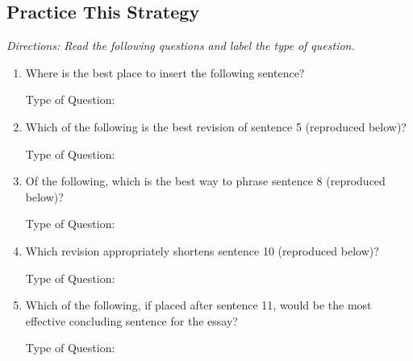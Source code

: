 \subsection{Practice This Strategy}
\textit{Directions: Read the following questions and label the type of question.}

\begin{enumerate}
\item Where is the best place to insert the following sentence?

Type of Question: \hrulefill

\item Which of the following is the best revision of sentence 5 (reproduced below)?

Type of Question: \hrulefill

\item Of the following, which is the best way to phrase sentence 8 (reproduced below)?

Type of Question: \hrulefill

\item Which revision appropriately shortens sentence 10 (reproduced below)?

Type of Question: \hrulefill

\item Which of the following, if placed after sentence 11, would be the most effective concluding sentence for the essay?

Type of Question: \hrulefill
\end{enumerate}